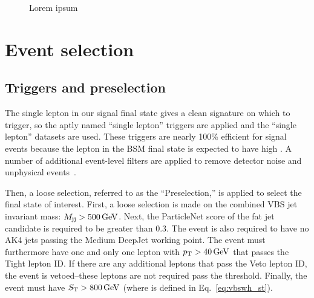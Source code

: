 \begin{figure}[htb]
    \centering
    \quad
    \caption{
        Lorem ipsum
    }
    \label{fig:vbswh_subl_bkg} %
\end{figure}

\section{Event selection}
\subsection{Triggers and preselection}
The single lepton in our signal final state gives a clean signature on which to trigger, so the aptly named ``single lepton'' triggers are applied and the ``single lepton'' datasets are used. 
These triggers are nearly 100\% efficient for signal events because the lepton in the BSM final state is expected to have high \pt. 
A number of additional event-level filters are applied to remove detector noise and unphysical events~\cite{JMEPaper}. 

Then, a loose selection, referred to as the ``Preselection,'' is applied to select the final state of interest. 
First, a loose selection is made on the combined VBS jet invariant mass: $M_{\mathrm{j}\mathrm{j}} > 500\,\text{Ge\hspace{-.08em}V}$.
Next, the ParticleNet \Xtobb score of the \Htobb fat jet candidate is required to be greater than 0.3.
The event is also required to have no AK4 jets passing the Medium DeepJet working point.
The event must furthermore have one and only one lepton with $p_{\mathrm{T}} > 40\,\text{Ge\hspace{-.08em}V}$ that passes the Tight lepton ID. 
If there are any additional leptons that pass the Veto lepton ID, the event is vetoed--these leptons are not required pass the \pt threshold. 
Finally, the event must have $S_{\mathrm{T}} > 800\,\text{Ge\hspace{-.08em}V}$ (where \ST is defined in Eq.~\ref{eq:vbswh_st}).

